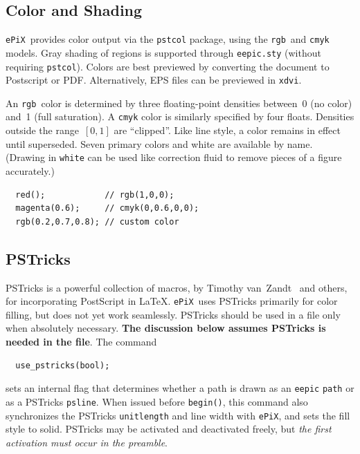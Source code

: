 \documentclass[12pt]{report}
\newcommand{\code}[1]{\texttt{#1}}
\newcommand{\filename}[1]{\texttt{#1}}
\newcommand{\ePiX}{\code{ePiX}}
\begin{document}
\subsection*{Color and Shading} 

 \ePiX\ provides
color output via the \code{pstcol} package, using the \code{rgb}~and
\code{cmyk} models. Gray shading of regions is supported through
\filename{eepic.sty} (without requiring \code{pstcol}).  Colors are
best previewed by converting the document to Postscript or
PDF. Alternatively, EPS files can be previewed in \code{xdvi}.

An \code{rgb}~color is determined by three floating-point densities
between~0 (no color) and~1 (full saturation).  A \code{cmyk} color
is similarly specified by four floats. Densities outside the
range~$[0,1]$ are ``clipped''.  Like line style, a color remains in
effect until superseded. Seven primary colors and white are available
by name. (Drawing in \code{white} can be used like correction fluid
to remove pieces of a figure accurately.)
\begin{verbatim}
  red();            // rgb(1,0,0);
  magenta(0.6);     // cmyk(0,0.6,0,0);
  rgb(0.2,0.7,0.8); // custom color
\end{verbatim}


\subsection*{PSTricks}

PSTricks is a powerful collection of macros, by Timothy
van~Zandt~\cite{Z} and others, for incorporating PostScript in \LaTeX.
\ePiX\ uses PSTricks primarily for color filling, but does not yet
work seamlessly. PSTricks should be used in a file only when
absolutely necessary. \textbf{The discussion below assumes PSTricks is
  needed in the file}.  The command
\begin{verbatim}
  use_pstricks(bool);
\end{verbatim}
sets an internal flag that determines whether a path is drawn as an
\filename{eepic} \code{path} or as a PSTricks
\code{psline}. When issued before
\code{begin()}, this command also synchronizes the PSTricks
\code{unitlength} and line width with \ePiX, and sets the fill style
to solid.  PSTricks may be activated and deactivated freely, but
\emph{the first activation must occur in the preamble}.
\end{document}
